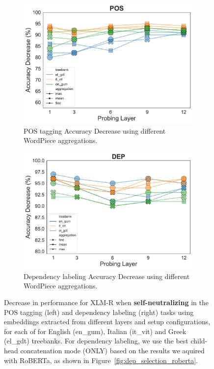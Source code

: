 \documentclass[11pt,a4paper]{article}
\begin{document}
\begin{figure}[ht]
    \centering
    \begin{subfigure}{\columnwidth}
        \centering
        \includegraphics[width=.9\textwidth]{configs/xlm-roberta-base_config_selection_POS.pdf}
        \caption{POS tagging Accuracy Decrease using different WordPiece
aggregations.}
        \label{fig:pos_selection_xlm}
    \end{subfigure}
    \begin{subfigure}{\columnwidth}
        \centering
        \includegraphics[width=.9\textwidth]{configs/xlm-roberta-base_config_selection_DEP.pdf}
        \caption{Dependency labeling Accuracy Decrease using different WordPiece aggregations.}
        \label{fig:dep_selection_xlm}
    \end{subfigure}
    \caption{Decrease in performance for XLM-R when \textbf{self-neutralizing} in the POS tagging (left) and dependency labeling (right) tasks using embeddings extracted from different layers and setup configurations, for each of for English (en\_gum), Italian (it\_vit) and Greek (el\_gdt) treebanks. For dependency labeling, we use the best child-head concatenation mode (ONLY) based on the results we aquired with RoBERTa, as shown in Figure~\ref{fig:dep_selection_roberta}.}
    \label{fig:selection_xlm}
\end{figure}
\end{document}
